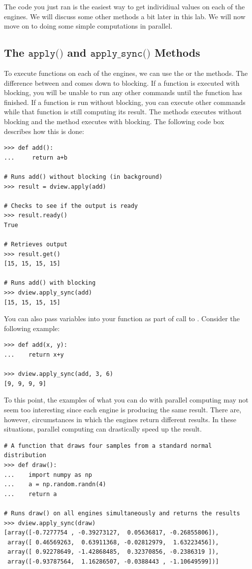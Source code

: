 The code you just ran is the easiest way to get individiual values on each of the engines. We will discuss some other methods a bit later in this lab. We will now move on to doing some simple computations in parallel.

\subsection*{The $\texttt{apply()}$ and $\texttt{apply\_sync()}$ Methods}
To execute functions on each of the engines, we can use the  or the  methods.  The difference between  and  comes down to blocking. If a function is executed with blocking, you will be unable to run any other commands until the function has finished. If a function is run without blocking, you can execute other commands while that function is still computing its result. The  methods executes without blocking and the  method executes with blocking. The following code box describes how this is done:

\begin{lstlisting}
>>> def add():
...     return a+b

# Runs add() without blocking (in background)
>>> result = dview.apply(add)

# Checks to see if the output is ready
>>> result.ready()
True

# Retrieves output
>>> result.get()
[15, 15, 15, 15]

# Runs add() with blocking
>>> dview.apply_sync(add)
[15, 15, 15, 15]
\end{lstlisting}

You can also pass variables into your function as part of call to . Consider the following example:

\begin{lstlisting}
>>> def add(x, y):
...    return x+y

>>> dview.apply_sync(add, 3, 6)
[9, 9, 9, 9]
\end{lstlisting}

To this point, the examples of what you can do with parallel computing may not seem too interesting since each engine is producing the same result.
There are, however, circumstances in which the engines return different results.
In these situations, parallel computing can drastically speed up the result.

\begin{lstlisting}
# A function that draws four samples from a standard normal distribution
>>> def draw():
...    import numpy as np
...    a = np.random.randn(4)
...    return a

# Runs draw() on all engines simultaneously and returns the results
>>> dview.apply_sync(draw)
[array([-0.7277754 , -0.39273127,  0.05636817, -0.26855806]),
 array([ 0.46569263,  0.63911368, -0.02812979,  1.63223456]),
 array([ 0.92278649, -1.42868485,  0.32370856, -0.2386319 ]),
 array([-0.93787564,  1.16286507, -0.0388443 , -1.10649599])]

\end{lstlisting}


